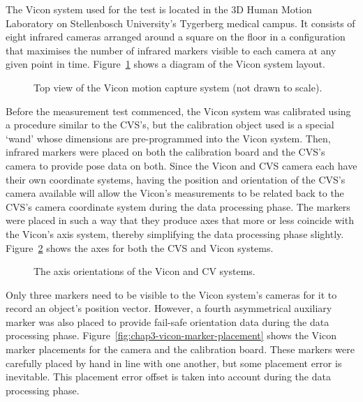 The Vicon system used for the test is located in the 3D Human Motion Laboratory on Stellenbosch University's Tygerberg medical campus. It consists of eight infrared cameras arranged around a square on the floor in a configuration that maximises the number of infrared markers visible to each camera at any given point in time. Figure~\ref{fig:chap3-vicon-layout} shows a diagram of the Vicon system layout. 
 
\begin{figure}
  \centering
  \def\svgwidth{0.5\textwidth}
  
  \caption[Top view of the Vicon motion capture system.]{Top view of the Vicon motion capture system (not drawn to scale).}
\label{fig:chap3-vicon-layout}
\end{figure}

Before the measurement test commenced, the Vicon system was calibrated using a procedure similar to the CVS's, but the calibration object used is a special `wand' whose dimensions are pre-programmed into the Vicon system. Then, infrared markers were placed on both the calibration board and the CVS's camera to provide pose data on both. Since the Vicon and CVS camera each have their own coordinate systems, having the position and orientation of the CVS's camera available will allow the Vicon's measurements to be related back to the CVS's camera coordinate system during the data processing phase. The markers were placed in such a way that they produce axes that more or less coincide with the Vicon's axis system, thereby simplifying the data processing phase slightly. Figure~\ref{fig:chap3-cam-vicon-axes} shows the axes for both the CVS and Vicon systems.

\begin{figure}
  \centering
  \def\svgwidth{0.5\textwidth}
  
  \caption{The axis orientations of the Vicon and CV systems.}
\label{fig:chap3-cam-vicon-axes}
\end{figure}

Only three markers need to be visible to the Vicon system's cameras for it to record an object's position vector. However, a fourth asymmetrical auxiliary marker was also placed to provide fail-safe orientation data during the data processing phase. Figure~\ref{fig:chap3-vicon-marker-placement} shows the Vicon marker placements for the camera and the calibration board. These markers were carefully placed by hand in line with one another, but some placement error is inevitable. This placement error offset is taken into account during the data processing phase. 

